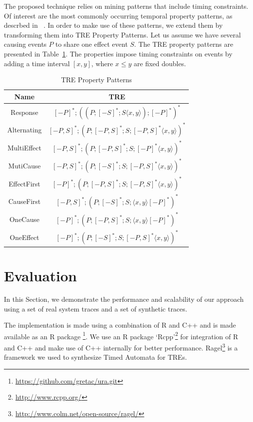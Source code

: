 \documentclass[]{sigplanconf}
\begin{document}
The proposed technique relies on mining patterns that include timing constraints. Of interest are the most commonly occurring temporal property patterns, as descrbed in ~\cite{evans1}. In order to make use of these patterns, we extend them by transforming them into TRE Property Patterns. Let us assume we have several causing events $P$ to share one effect event $S$. The TRE property patterns are presented in Table~\ref{TRE_Exp}. The properties impose timing constraints on events by adding a time interval $[x, y]$, where $x \le y$ are fixed doubles.

\begin{table}[ht]
  \centering
  \begin{tabular}{|c|c|}
  \hline
  \textbf{Name} & \textbf{TRE}  \\ \hline
  Response      & $[-P]^*;((P;[-S]^*;S \langle x,y \rangle);[-P]^*)^*$        \\ \hline
  Alternating   & $[-P,S]^*;(P;[-P,S]^*;S;[-P,S]^* \langle x,y \rangle)^*$       \\ \hline
  MultiEffect   &  $[-P,S]^*;(P;[-P,S]^*;S;[-P]^* \langle x,y \rangle)^*$     \\ \hline
  MutiCause     &  $[-P,S]^*;(P;[-S]^*;S;[-P,S]^* \langle x,y \rangle)^*$     \\ \hline
  EffectFirst   &  $[-P]^*;(P;[-P,S]^*;S;[-P,S]^* \langle x,y \rangle)^*$      \\ \hline
  CauseFirst    &  $[-P,S]^*;(P;[-S]^*;S;\langle x,y \rangle [-P]^*)^*$       \\ \hline
  OneCause      &  $[-P]^*;(P;[-P,S]^*;S;\langle x,y \rangle [-P]^*)^*$       \\ \hline
  OneEffect     &  $[-P]^*;(P;[-S]^*;S;[-P,S]^* \langle x,y \rangle)^*$       \\ \hline
\end{tabular}
\caption{TRE Property Patterns}\label{TRE_Exp}
\end{table}


\section{Evaluation}

In this Section, we demonstrate the performance and scalability of our approach using a set of real system traces and a set of synthetic traces.

The implementation is made using a combination of R and C++ and is made available as an R package \footnote{\url{https://github.com/gretac/ura.git}}. We use an R package `Rcpp'\footnote{\url{http://www.rcpp.org/}} for integration of R and C++ and make use of C++ internally for better performance. Ragel\footnote{\url{http://www.colm.net/open-source/ragel/}} is a framework we used to synthesize Timed Automata for TREs.
\end{document}

